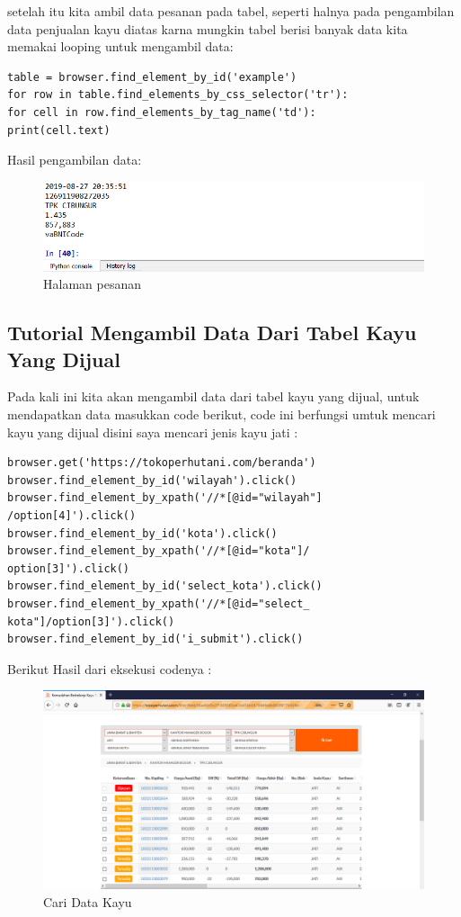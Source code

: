 setelah itu kita ambil data pesanan pada tabel, seperti halnya pada pengambilan data penjualan kayu diatas karna mungkin tabel berisi banyak data kita memakai looping untuk mengambil data:
\begin{verbatim}
table = browser.find_element_by_id('example')
for row in table.find_elements_by_css_selector('tr'):
for cell in row.find_elements_by_tag_name('td'):
print(cell.text)
\end{verbatim}
\newpage
Hasil pengambilan data:
\begin{figure}[h]
	\centering
	\includegraphics[scale=0.55]{figures/8datapesan}
	\caption{Halaman pesanan}
\end{figure}


\newpage
\subsection{Tutorial Mengambil Data Dari Tabel Kayu Yang Dijual}
Pada kali ini kita akan mengambil data dari tabel kayu yang dijual, untuk mendapatkan data masukkan code berikut, code ini berfungsi umtuk mencari kayu yang dijual disini saya mencari jenis kayu jati :
\begin{verbatim}
browser.get('https://tokoperhutani.com/beranda')
browser.find_element_by_id('wilayah').click()
browser.find_element_by_xpath('//*[@id="wilayah"]
/option[4]').click()
browser.find_element_by_id('kota').click()
browser.find_element_by_xpath('//*[@id="kota"]/
option[3]').click()
browser.find_element_by_id('select_kota').click()
browser.find_element_by_xpath('//*[@id="select_
kota"]/option[3]').click()
browser.find_element_by_id('i_submit').click()
\end{verbatim}
Berikut Hasil dari eksekusi codenya :
\begin{figure}[h]
	\centering
	\includegraphics[scale=0.3]{figures/caridatakayu}
	\caption{Cari Data Kayu}
\end{figure}

